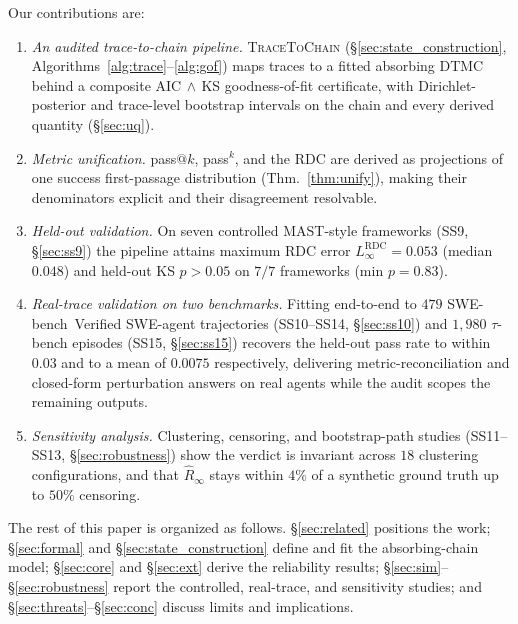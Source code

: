 Our contributions are:
\begin{enumerate}[(1)]
  \item \emph{An audited trace-to-chain pipeline.}
  \textsc{TraceToChain} (\S\ref{sec:state_construction},
  Algorithms~\ref{alg:trace}--\ref{alg:gof}) maps traces to a fitted
  absorbing DTMC behind a composite AIC$\,\wedge\,$KS goodness-of-fit
  certificate, with Dirichlet-posterior and trace-level bootstrap
  intervals on the chain and every derived quantity (\S\ref{sec:uq}).
  \item \emph{Metric unification.}
  pass$@k$, pass$^k$, and the RDC are derived as projections of one
  success first-passage distribution (Thm.~\ref{thm:unify}), making
  their denominators explicit and their disagreement resolvable.
  \item \emph{Held-out validation.}
  On seven controlled MAST-style frameworks (SS9, \S\ref{sec:ss9}) the
  pipeline attains maximum RDC error
  $L_\infty^{\mathrm{RDC}}=0.053$ (median $0.048$) and held-out KS
  $p>0.05$ on $7/7$ frameworks (min $p=0.83$).
  \item \emph{Real-trace validation on two benchmarks.}
  Fitting end-to-end to $479$ SWE-bench~Verified SWE-agent trajectories
  (SS10--SS14, \S\ref{sec:ss10}) and $1{,}980$ $\tau$-bench episodes
  (SS15, \S\ref{sec:ss15}) recovers the held-out pass rate to within
  $0.03$ and to a mean of $0.0075$ respectively, delivering
  metric-reconciliation and closed-form perturbation answers on real
  agents while the audit scopes the remaining outputs.
  \item \emph{Sensitivity analysis.}
  Clustering, censoring, and bootstrap-path studies
  (SS11--SS13, \S\ref{sec:robustness}) show the verdict is invariant
  across $18$ clustering configurations, and that $\hat R_\infty$ stays
  within $4\%$ of a synthetic ground truth up to $50\%$ censoring.
\end{enumerate}

The rest of this paper is organized as follows.
\S\ref{sec:related} positions the work; \S\ref{sec:formal} and
\S\ref{sec:state_construction} define and fit the absorbing-chain
model; \S\ref{sec:core} and \S\ref{sec:ext} derive the reliability
results; \S\ref{sec:sim}--\S\ref{sec:robustness} report the controlled,
real-trace, and sensitivity studies; and
\S\ref{sec:threats}--\S\ref{sec:conc} discuss limits and implications.

